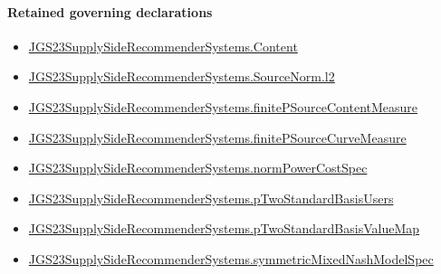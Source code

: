 \documentclass[10pt]{article}
\begin{document}
\paragraph{Retained governing declarations}
\begin{itemize}\raggedright
\item \hyperlink{governing-declaration-367305fda50f0ada}{JGS23\allowbreak{}Supply\allowbreak{}Side\allowbreak{}Recommender\allowbreak{}Systems.\allowbreak{}Content}
\item \hyperlink{governing-declaration-9299663ffe3ecb38}{JGS23\allowbreak{}Supply\allowbreak{}Side\allowbreak{}Recommender\allowbreak{}Systems.\allowbreak{}Source\allowbreak{}Norm.\allowbreak{}l2}
\item \hyperlink{governing-declaration-a54a8b295f2b6952}{JGS23\allowbreak{}Supply\allowbreak{}Side\allowbreak{}Recommender\allowbreak{}Systems.\allowbreak{}finite\allowbreak{}P\allowbreak{}Source\allowbreak{}Content\allowbreak{}Measure}
\item \hyperlink{governing-declaration-fb2d1fd9a38e71b9}{JGS23\allowbreak{}Supply\allowbreak{}Side\allowbreak{}Recommender\allowbreak{}Systems.\allowbreak{}finite\allowbreak{}P\allowbreak{}Source\allowbreak{}Curve\allowbreak{}Measure}
\item \hyperlink{governing-declaration-6ba13dc1cae95e6e}{JGS23\allowbreak{}Supply\allowbreak{}Side\allowbreak{}Recommender\allowbreak{}Systems.\allowbreak{}norm\allowbreak{}Power\allowbreak{}Cost\allowbreak{}Spec}
\item \hyperlink{governing-declaration-b00b3d57e66564ea}{JGS23\allowbreak{}Supply\allowbreak{}Side\allowbreak{}Recommender\allowbreak{}Systems.\allowbreak{}p\allowbreak{}Two\allowbreak{}Standard\allowbreak{}Basis\allowbreak{}Users}
\item \hyperlink{governing-declaration-c13a6748f5c431e4}{JGS23\allowbreak{}Supply\allowbreak{}Side\allowbreak{}Recommender\allowbreak{}Systems.\allowbreak{}p\allowbreak{}Two\allowbreak{}Standard\allowbreak{}Basis\allowbreak{}Value\allowbreak{}Map}
\item \hyperlink{paper-prerequisite-b412efba7deb757f}{JGS23\allowbreak{}Supply\allowbreak{}Side\allowbreak{}Recommender\allowbreak{}Systems.\allowbreak{}symmetric\allowbreak{}Mixed\allowbreak{}Nash\allowbreak{}Model\allowbreak{}Spec}
\end{itemize}
\end{document}
